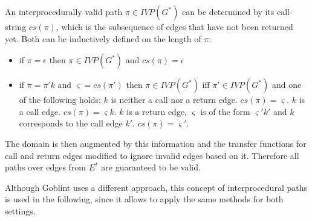 An interprocedurally valid path $\pi \in \mathit{IVP}(G^*)$ can be determined by its call-string $cs(\pi)$, which is the subsequence of edges that have not been returned yet. Both can be inductively defined on the length of $\pi$:
\begin{itemize}
\item if $\pi = \epsilon$ then $\pi \in \mathit{IVP}(G^*)$ and $cs(\pi) = \epsilon$
\item if $\pi = \pi' k$ and $\varsigma = cs(\pi')$ then $\pi \in \mathit{IVP}(G^*)$ iff $\pi' \in \mathit{IVP}(G^*)$ and one of the following holds:
\subitem $k$ is neither a call nor a return edge. $cs(\pi) = \varsigma$.
\subitem $k$ is a call edge. $cs(\pi) = \varsigma k$.
\subitem $k$ is a return edge, $\varsigma$ is of the form $\varsigma' k'$ and $k$ corresponds to the call edge $k'$. $cs(\pi) = \varsigma'$.
\end{itemize}

The domain is then augmented by this information and the transfer functions for call and return edges modified to ignore invalid edges based on it. Therefore all paths over edges from $E^*$ are guaranteed to be valid.

Although Goblint uses a different approach, this concept of interprocedural paths is used in the following, since it allows to apply the same methods for both settings.




